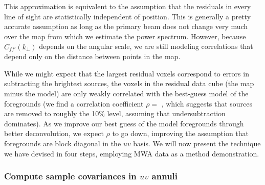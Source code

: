 This approximation is equivalent to the assumption that the residuals in every line of sight are statistically independent of position. This is generally a pretty accurate assumption as long as the primary beam does not change very much over the map from which we estimate the power spectrum. However, because $\widehat{C}_{ff'}(k_\perp)$ depends on the angular scale, we are still modeling correlations that depend only on the distance between points in the map. 

While we might expect that the largest residual voxels correspond to errors in subtracting the brightest sources, the voxels in the residual data cube (the map minus the model) are only weakly correlated with the best-guess model of the foregrounds (we find a correlation coefficient $\rho =$ \modelResidualCorr, which suggests that sources are removed to roughly the 10\% level, assuming that undersubtraction dominates). As we improve our best guess of the model foregrounds through better deconvolution, we expect $\rho$ to go down, improving the assumption that foregrounds are block diagonal in the $uv$ basis. We will now present the technique we have devised in four steps, employing MWA data as a method demonstration.


\subsubsection{Compute sample covariances in $uv$ annuli}

